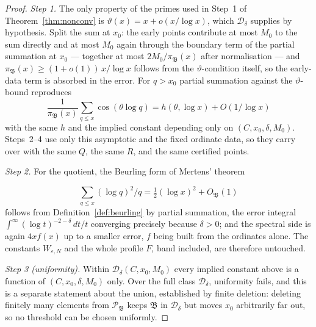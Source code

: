 \documentclass[11pt]{article}
\newcommand{\Dclass}{\mathcal{D}_\delta}        %
\newcommand{\WeN}{W_{\varepsilon,N}}
\begin{document}
\begin{proof}
\textit{Step 1.} The only property of the primes used in Step~1 of
Theorem~\ref{thm:nonconv} is $\vartheta(x)=x+o(x/\log x)$, which
$\Dclass$ supplies by hypothesis. Split the sum at $x_0$: the early points
contribute at most $M_0$ to the sum directly and at most $M_0$ again through
the boundary term of the partial summation at $x_0$ --- together at most
$2M_0/\pi_{\mathfrak{B}}(x)$ after normalisation --- and
$\pi_{\mathfrak{B}}(x)\ge(1+o(1))\,x/\log x$ follows from the $\vartheta$-condition
itself, so the early-data term is absorbed in the error. For $q>x_0$ partial
summation against the $\vartheta$-bound reproduces
\[
\frac{1}{\pi_{\mathfrak{B}}(x)}\sum_{q\le x}\cos(\theta\log q)=h(\theta,\log x)+O(1/\log x)
\]
with the same $h$ and the implied constant depending only on
$(C,x_0,\delta,M_0)$. Steps~2--4 use only this asymptotic and the fixed ordinate
data, so they carry over with the same $Q$, the same $R$, and the same
certified points.

\textit{Step 2.} For the quotient, the Beurling form of Mertens' theorem

\[
\sum_{q\le x}(\log q)^2/q=\tfrac12(\log x)^2+O_{\mathfrak{B}}(1)
\]
 follows from
Definition~\ref{def:beurling} by partial summation, the error integral
$\int^\infty(\log t)^{-2-\delta}\,dt/t$ converging precisely because
$\delta>0$; and the spectral side is again $4xf(x)$ up to a smaller error,
$f$ being built from the ordinates alone. The constants $\WeN$ and the whole profile $F$, band included, are therefore
untouched.

\textit{Step 3 (uniformity).} Within $\Dclass(C,x_0,M_0)$ every implied
constant above is a function of $(C,x_0,\delta,M_0)$ only. Over the full
class $\Dclass$, uniformity fails, and this is a separate statement about
the union, established by finite deletion: deleting finitely many elements
from $\mathcal{P}_{\mathfrak{B}}$ keeps $\mathfrak{B}$ in $\Dclass$ but moves $x_0$ arbitrarily far out, so no
threshold can be chosen uniformly.
\end{proof}
\end{document}
